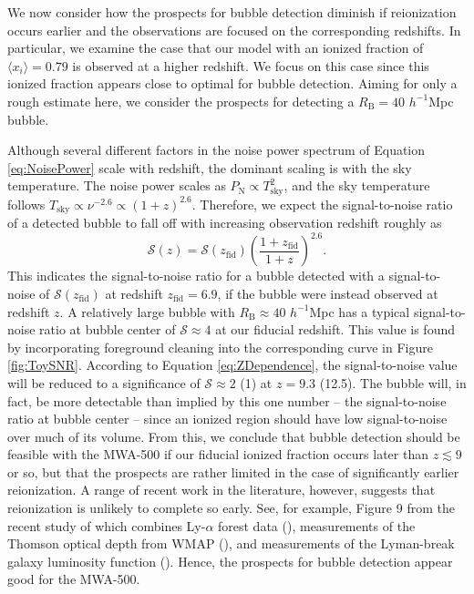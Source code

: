 We now consider how the prospects for bubble detection diminish if reionization occurs
earlier and the observations are focused on the corresponding redshifts.
In particular, we examine the case that our model with an ionized fraction
of $\langle x_i \rangle = 0.79$ is observed at a higher redshift. We focus on this case since
this ionized fraction appears close to optimal for bubble detection.
Aiming for only a rough estimate here, we consider the prospects for
detecting a $R_{\text{B}} = 40$ $h^{-1}$Mpc bubble. 

Although several different factors in the noise power spectrum of
Equation \ref{eq:NoisePower} scale with redshift, the dominant
scaling is with the sky temperature. The noise power scales
as $P_{\text{N}} \propto T_{\text{sky}}^{2}$, and the
sky temperature follows $T_{\text{sky}} \propto \nu^{-2.6} \propto
(1+z)^{2.6}$. Therefore, we expect the signal-to-noise ratio of
a detected bubble to fall off with increasing observation redshift roughly as
\begin{equation}
\mathcal{S}(z) = \mathcal{S}(z_{\text{fid}}) \left(\frac{1+z_{\text{fid}}}{1+z}\right)^{2.6}. \label{eq:ZDependence}
\end{equation}
This indicates the signal-to-noise ratio for a bubble detected with
a signal-to-noise of $\mathcal{S}(z_{\text{fid}})$ at redshift $z_{\text{fid}} = 6.9$, 
if the bubble were instead observed at redshift $z$. A relatively large bubble with
$R_{\text{B}} \approx 40$ $h^{-1}$Mpc has a typical signal-to-noise ratio at bubble center 
of $\mathcal{S} \approx 4$
at our fiducial redshift. This value is found by incorporating foreground cleaning into the corresponding curve in Figure \ref{fig:ToySNR}. 
According to Equation \ref{eq:ZDependence}, the signal-to-noise value will be reduced to a significance of $\mathcal{S}
\approx 2$ (1) at $z = 9.3$ (12.5). The bubble will, in fact, be more detectable than implied by this one number -- the
signal-to-noise ratio at bubble center -- since
an ionized region should have low signal-to-noise over much of its volume. From this, we conclude that bubble
detection should be feasible with the MWA-500 if our fiducial ionized fraction occurs later than $z \lesssim 9$ or so,
but that the prospects are rather limited in the case of significantly earlier
reionization. A range of recent work in the literature, however, suggests that
reionization is unlikely to complete so early. See, for example, Figure 9 from the recent
study of \cite{Kuhlen:2012vy} which combines
Ly-$\alpha$ forest data (\citealt{Fan:2005es}), measurements of the
Thomson optical depth from WMAP (\citealt{Komatsu:2010fb}), and measurements of the Lyman-break
galaxy luminosity function (\citealt{Bouwens:2009qs}). Hence, the prospects for bubble detection appear good for the MWA-500.


